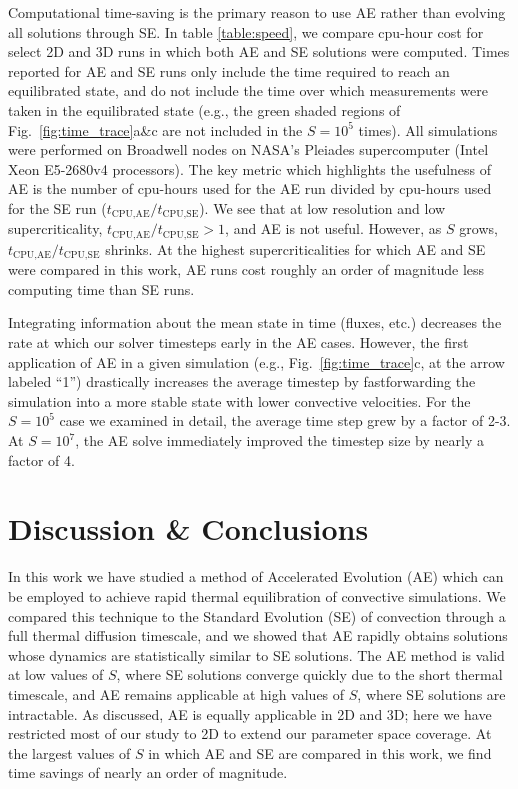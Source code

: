 \documentclass[aps, pre, onecolumn, nofootinbib, notitlepage, groupedaddress, amsfonts, amssymb, amsmath, longbibliography]{revtex4-1}
\begin{document}
Computational time-saving is the primary reason to use AE rather than 
evolving all solutions through SE.
In table 
\ref{table:speed}, we compare cpu-hour cost for select
2D and 3D runs in which both AE and SE solutions were computed. Times reported
for AE and SE runs only include the time required to reach an equilibrated
state, and do not include the time over which measurements were taken
in the equilibrated state (e.g., the green shaded regions of
Fig.~\ref{fig:time_trace}a\&c are not included in the $S = 10^5$ times).
All simulations
were performed on Broadwell nodes on NASA's Pleiades supercomputer 
(Intel Xeon E5-2680v4 processors). The key metric which highlights the usefulness
of AE is the number of cpu-hours used for the AE run divided by cpu-hours used
for the SE run ($t_{\text{CPU,AE}}/t_{\text{CPU,SE}}$). We see that at low
resolution and low supercriticality, $t_{\text{CPU,AE}}/t_{\text{CPU,SE}} > 1$,
and AE is not useful. However, as $S$ grows, $t_{\text{CPU,AE}}/t_{\text{CPU,SE}}$
shrinks. At the highest supercriticalities for which AE and SE were compared
in this work, AE runs cost roughly an order of magnitude less computing time 
than SE runs.

Integrating information about the mean state in time (fluxes, etc.)
decreases the rate at which our solver timesteps early in the AE cases. 
However, 
the first application of AE in a given simulation 
(e.g., Fig.~\ref{fig:time_trace}c, at the arrow labeled ``1'') drastically
increases the average timestep by fastforwarding the simulation into
a more stable state with lower convective velocities. 
For the $S = 10^5$ case we examined in detail, the
average time step grew by a factor of 2-3.
At $S = 10^7$, the AE solve immediately improved the timestep size 
by nearly a factor of 4.




\newpage
\section{Discussion \& Conclusions}
\label{sec:extensions}
In this work we have studied a method of Accelerated Evolution (AE) which can
be employed to achieve rapid thermal equilibration of convective simulations.  We compared
this technique to the Standard Evolution (SE) of convection through a full thermal diffusion timescale,
and we
showed that AE rapidly obtains solutions whose dynamics are statistically similar to SE solutions.
The AE method is valid at low values of $S$, where SE solutions
converge quickly due to the short thermal timescale, and AE remains applicable
at high values of $S$, where SE solutions are intractable.
As discussed, AE is equally applicable in 2D and 3D; here we have restricted most of our study to 2D
to extend our parameter space coverage.
At the largest values of $S$ in which AE and SE are compared in this work, we find
time savings of nearly an order of magnitude. 
\end{document}
